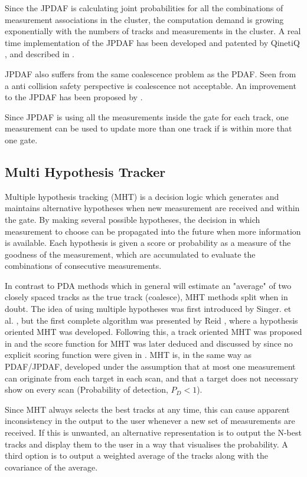 Since the JPDAF is calculating joint probabilities for all the combinations of measurement associations in the cluster, the computation demand is growing exponentially with the numbers of tracks and measurements in the cluster. A real time implementation of the JPDAF has been developed and patented by QinetiQ \cite{QinetiQ2003}, and described in \cite{Horridge}.

JPDAF also suffers from the same coalescence problem as the PDAF. Seen from a anti collision safety perspective is coalescence not acceptable. An improvement to the JPDAF has been proposed by \cite{Blom2000}.

Since JPDAF is using all the measurements inside the gate for each track, one measurement can be used to update more than one track if is within more that one gate.

\subsection{Multi Hypothesis Tracker}
\label{sec:mht}
Multiple hypothesis tracking (MHT) is a decision logic which generates and maintains alternative hypotheses when new measurement are received and within the gate. By making several possible hypotheses, the decision in which measurement to choose can be propagated into the future when more information is available. Each hypothesis is given a score or probability as a measure of the goodness of the measurement, which are accumulated to evaluate the combinations of consecutive measurements.

In contrast to PDA methods which in general will estimate an "average" of two closely spaced tracks as the true track (coalesce), MHT methods split when in doubt. The idea of using multiple hypotheses was first introduced by Singer. et al. \cite{Singer1974}, but the first complete algorithm was presented by Reid \cite{Reid1978}, where a hypothesis oriented MHT was developed. Following this, a track oriented MHT was proposed in \cite{Kurien1990} and the score function for MHT was later deduced and discussed by \cite{Bar-Shalom2007} since no explicit scoring function were given in \cite{Kurien1990}. MHT is, in the same way as PDAF/JPDAF, developed under the assumption that at most one measurement can originate from each target in each scan, and that a target does not necessary show on every scan (Probability of detection, $P_D < 1$).

Since MHT always selects the best tracks at any time, this can cause apparent inconsistency in the output to the user whenever a new set of measurements are received. If this is unwanted, an alternative representation is to output the N-best tracks and display them to the user in a way that visualises the probability. A third option is to output a weighted average of the tracks along with the covariance of the average.

